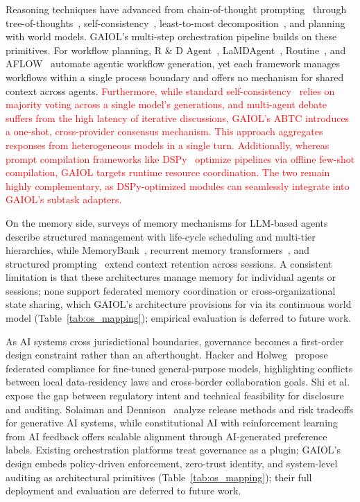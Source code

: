 \documentclass{iopjournal}
\newcommand{\rev}[1]{\textcolor{red}{#1}}
\begin{document}
Reasoning techniques have advanced from chain-of-thought prompting~\cite{CoT_NeurIPS22} through tree-of-thoughts~\cite{Tree_NeurIPS23}, self-consistency~\cite{SelfConsistency_ICLR23}, least-to-most decomposition~\cite{Least2Most_EMNLP22}, and planning with world models. GAIOL's multi-step orchestration pipeline builds on these primitives. For workflow planning, R \& D Agent~\cite{RDAgent}, LaMDAgent~\cite{qian2024chatdev}, Routine~\cite{Routine}, and AFLOW~\cite{AFLOW} automate agentic workflow generation, yet each framework manages workflows within a single process boundary and offers no mechanism for shared context across agents. \rev{Furthermore, while standard self-consistency~\cite{SelfConsistency_ICLR23} relies on majority voting across a single model's generations, and multi-agent debate~\cite{Cooperation_NeurIPS23} suffers from the high latency of iterative discussions, GAIOL's ABTC introduces a one-shot, cross-provider consensus mechanism. This approach aggregates responses from heterogeneous models in a single turn. Additionally, whereas prompt compilation frameworks like DSPy~\cite{dspy} optimize pipelines via offline few-shot compilation, GAIOL targets runtime resource coordination. The two remain highly complementary, as DSPy-optimized modules can seamlessly integrate into GAIOL's subtask adapters.}

On the memory side, surveys of memory mechanisms for LLM-based agents~\cite{MemoryOS} describe structured management with life-cycle scheduling and multi-tier hierarchies, while MemoryBank~\cite{MemoryBank_ACL23}, recurrent memory transformers~\cite{RecurrentMemory_NeurIPS23}, and structured prompting~\cite{LongContext_ICML24} extend context retention across sessions. A consistent limitation is that these architectures manage memory for individual agents or sessions; none support federated memory coordination or cross-organizational state sharing, which GAIOL's architecture provisions for via its continuous world model (Table~\ref{tab:os_mapping}); empirical evaluation is deferred to future work.

As AI systems cross jurisdictional boundaries, governance becomes a first-order design constraint rather than an afterthought. Hacker and Holweg~\cite{FineTuningReg} propose federated compliance for fine-tuned general-purpose models, highlighting conflicts between local data-residency laws and cross-border collaboration goals. Shi et al.~\cite{FM_Governance} expose the gap between regulatory intent and technical feasibility for disclosure and auditing. Solaiman and Dennison~\cite{SafetyTaxonomy_FAccT23} analyze release methods and risk tradeoffs for generative AI systems, while constitutional AI with reinforcement learning from AI feedback offers scalable alignment through AI-generated preference labels. Existing orchestration platforms treat governance as a plugin; GAIOL's design embeds policy-driven enforcement, zero-trust identity, and system-level auditing as architectural primitives (Table~\ref{tab:os_mapping}); their full deployment and evaluation are deferred to future work.
\end{document}
